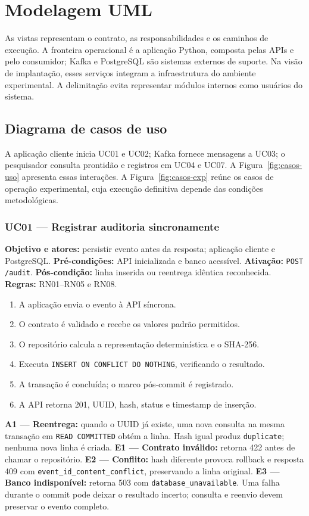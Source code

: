 \section{Modelagem UML}
\label{sec:uml}
As vistas representam o contrato, as responsabilidades e os caminhos de execução. A fronteira operacional é a aplicação Python, composta pelas APIs e pelo consumidor; Kafka e PostgreSQL são sistemas externos de suporte. Na visão de implantação, esses serviços integram a infraestrutura do ambiente experimental. A delimitação evita representar módulos internos como usuários do sistema.

\subsection{Diagrama de casos de uso}
A aplicação cliente inicia UC01 e UC02; Kafka fornece mensagens a UC03; o pesquisador consulta prontidão e registros em UC04 e UC07. A Figura~\ref{fig:casos-uso} apresenta essas interações. A Figura~\ref{fig:casos-exp} reúne os casos de operação experimental, cuja execução definitiva depende das condições metodológicas.


\subsubsection{UC01 --- Registrar auditoria sincronamente}
\textbf{Objetivo e atores:} persistir evento antes da resposta; aplicação cliente e PostgreSQL.
\textbf{Pré-condições:} API inicializada e banco acessível.
\textbf{Ativação:} \texttt{POST /audit}.
\textbf{Pós-condição:} linha inserida ou reentrega idêntica reconhecida.
\textbf{Regras:} RN01--RN05 e RN08.
\begin{enumerate}
\item A aplicação envia o evento à API síncrona.
\item O contrato é validado e recebe os valores padrão permitidos.
\item O repositório calcula a representação determinística e o SHA-256.
\item Executa \texttt{INSERT ON CONFLICT DO NOTHING}, verificando o resultado.
\item A transação é concluída; o marco pós-commit é registrado.
\item A API retorna 201, UUID, hash, status e timestamp de inserção.
\end{enumerate}
\textbf{A1 --- Reentrega:} quando o UUID já existe, uma nova consulta na mesma transação em \texttt{READ COMMITTED} obtém a linha. Hash igual produz \texttt{duplicate}; nenhuma nova linha é criada.
\textbf{E1 --- Contrato inválido:} retorna 422 antes de chamar o repositório.
\textbf{E2 --- Conflito:} hash diferente provoca rollback e resposta 409 com \texttt{event\_id\_content\_conflict}, preservando a linha original.
\textbf{E3 --- Banco indisponível:} retorna 503 com \texttt{database\_unavailable}. Uma falha durante o commit pode deixar o resultado incerto; consulta e reenvio devem preservar o evento completo.

